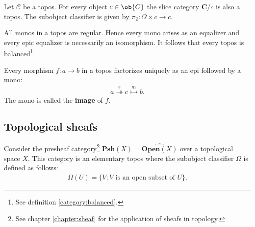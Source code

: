     \begin{example}
        Let $\mathcal{C}$ be a topos. For every object $c\in\ob{C}$ the slice category $\mathbf{C}/c$ is also a topos. The subobject classifier is given by $\pi_2:\Omega\times c\rightarrow c$.
    \end{example}

    \begin{property}[Balanced]
        All monos in a topos are regular. Hence every mono arises as an equalizer and every epic equalizer is necessarily an isomorphism. It follows that every topos is balanced\footnote{See definition \ref{category:balanced}.}.
    \end{property}

    \begin{property}
        Every morphism $f:a\rightarrow b$ in a topos factorizes uniquely as an epi followed by a mono:
        \begin{gather}
            a\overset{e}{\twoheadrightarrow} c\overset{m}{\rightarrowtail} b.
        \end{gather}
        The mono is called the \textbf{image} of $f$.
    \end{property}

\subsection{Topological sheafs}

    \begin{property}\label{topoi:sheaf_topos}
        Consider the presheaf category\footnote{See chapter \ref{chapter:sheaf} for the application of sheafs in topology.} $\mathbf{Psh}(X) = \widehat{\mathbf{Open}(X)}$ over a topological space $X$. This category is an elementary topos where the subobject classifier $\Omega$ is defined as follows:
        \begin{gather}
            \Omega(U) = \{V:V\text{ is an open subset of }U\}.
        \end{gather}
    \end{property}

